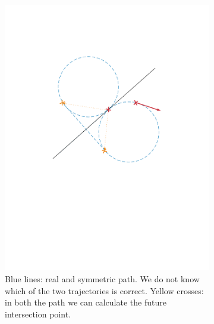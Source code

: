 \begin{itemize}
\begin{figure}[!htbp]
   \begin{subfigure}[b]{0.45\textwidth}
        \includegraphics[width=\textwidth]{img/intersection_3.pdf}
        \caption{Blue lines: real and symmetric path. We do not know which of the two trajectories is correct. Yellow crosses: in both the path we can calculate the future intersection point.}
        \label{fig:three}
   \end{subfigure}\hfill
    \begin{subfigure}[b]{0.45\textwidth}

\end{subfigure}
\end{figure}
\end{itemize}
